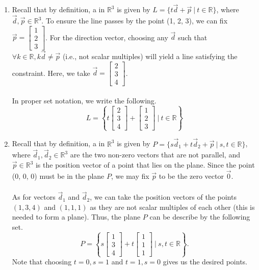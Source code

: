 \begin{SaveQuestion}
\begin{enumerate}
    \item Recall that by definition, a  in $\mathbb{R}^3$ is given by $L = \{t \vec d  + \vec p \ | \ t \in \mathbb{R}\}$, where $\vec d, \vec p \in \mathbb{R}^3$. To ensure the line passes by the point (1, 2, 3), we can fix $\vec p = \begin{bmatrix} 1 \\ 2 \\ 3 \end{bmatrix}$. For the direction vector, choosing any $\vec d$ such that $\forall k \in \mathbb{R}, k \vec d \neq \vec p$ (i.e., not scalar multiples) will yield a line satisfying the constraint. Here, we take $\vec d = \begin{bmatrix} 2 \\ 3 \\ 4 \end{bmatrix}$. \\ \\
    In proper set notation, we write the following\PullLS*[2].
    $$L = \left\{ t \begin{bmatrix} 2 \\ 3 \\ 4 \end{bmatrix} + \begin{bmatrix} 1 \\ 2 \\ 3 \end{bmatrix} \ | \ t \in \mathbb{R}\right\}$$ 

    \item Recall that by definition, a  in $\mathbb{R}^3$ is given by $P = \{s\vec d_1 + t\vec d_2 + \vec p \ | \ s,t \in \mathbb{R}\}$, where $\vec d_1, \vec d_2 \in \mathbb{R}^3$ are the two non-zero vectors that are not parallel, and $\vec p \in \mathbb{R}^3$ is the position vector of a point that lies on the plane. Since the point (0, 0, 0) must be in the plane $P$, we may fix $\vec p$ to be the zero vector $\vec 0$. \\ \\
    As for vectors $\vec d_1$ and $\vec d_2$, we can take the position vectors of the points $(1, 3, 4)$ and $(1, 1, 1)$ as they are not scalar multiples of each other (this is needed to form a plane). Thus, the plane $P$ can be describe by the following set\PullLS*[2].
    $$P = \left\{s \begin{bmatrix} 1 \\ 3 \\ 4 \end{bmatrix} + t \begin{bmatrix} 1 \\ 1 \\ 1 \end{bmatrix} \ | \ s,t \in\mathbb{R}\right\}.$$
    Note that choosing $t=0, s=1$ and $t=1, s=0$ gives us the desired points. 
\end{enumerate}
\end{SaveQuestion}


